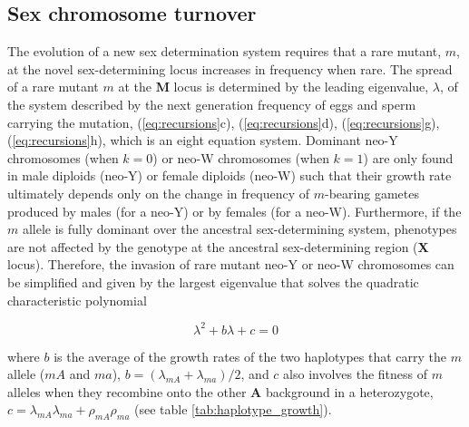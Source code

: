 \documentclass[12pt]{article}
\begin{document}
\subsection*{Sex chromosome turnover}
The evolution of a new sex determination system requires that a rare mutant, $m$, at the novel sex-determining locus  increases in frequency when rare. 
The spread of a rare mutant $m$ at the \textbf{M} locus is determined by the leading eigenvalue, $\lambda$, of the system described by the next generation frequency of eggs and sperm carrying the mutation, (\ref{eq:recursions}c), (\ref{eq:recursions}d), (\ref{eq:recursions}g), (\ref{eq:recursions}h), which is an eight equation system. %
Dominant neo-Y chromosomes (when $k=0$) or neo-W chromosomes (when $k=1$) are only found in male diploids (neo-Y) or female diploids (neo-W) such that their growth rate ultimately depends only on the change in frequency of $m$-bearing gametes produced by males (for a neo-Y) or by females (for a neo-W). 
Furthermore, if the $m$ allele is fully dominant over the ancestral sex-determining system, phenotypes are not affected by the genotype at the ancestral sex-determining region (\textbf{X} locus). 
Therefore, the invasion of rare mutant neo-Y or neo-W chromosomes can be simplified and given by the largest eigenvalue that solves the quadratic characteristic polynomial

\begin{equation}
\lambda^2+ b \lambda + c =0
\label{eq:charpoly_neoY}
\end{equation}

\noindent
where $b$ is the average of the growth rates of the two haplotypes that carry the $m$ allele ($mA$ and $ma$), $b=(\lambda_{mA}+\lambda_{ma})/2$, and $c$ also involves the fitness of $m$ alleles when they recombine onto the other \textbf{A} background in a heterozygote, $c=\lambda_{mA}\lambda_{ma}+\rho_{mA}\rho_{ma}$ (see table \ref{tab:haplotype_growth}).
\end{document}
